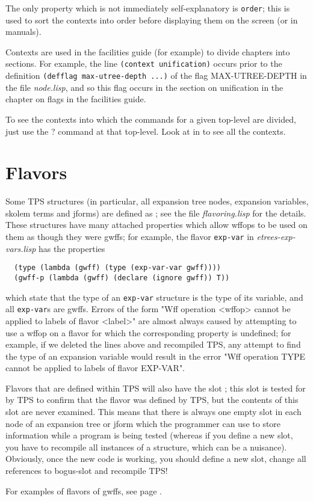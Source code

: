 The only property which is not immediately self-explanatory is {\tt order}; this is used to sort
the contexts into order before displaying them on the screen (or in manuals).

Contexts are used in the facilities guide (for example) to divide
chapters into sections. For example, the line
{\tt (context unification)}
occurs prior to the definition 
{\tt (defflag max-utree-depth ...)}
of the flag MAX-UTREE-DEPTH in the file {\it node.lisp},
and so this flag occurs in the section on unification in the
chapter on flags in the facilities guide.

To see the contexts into which the commands for a given top-level
are divided, just use the ? command at that top-level.
Look at  in \TPS to see all the contexts.

\section{Flavors}
\label{flavors}

Some TPS structures (in particular, all expansion tree nodes, expansion variables, skolem terms and jforms) 
are defined as ; see the file {\it flavoring.lisp} for 
the details. These structures have many attached properties which allow 
wffops to be used on them as though they were gwffs; for example, the flavor
{\tt exp-var} in {\it etrees-exp-vars.lisp} has the properties
\begin{verbatim}
  (type (lambda (gwff) (type (exp-var-var gwff))))
  (gwff-p (lambda (gwff) (declare (ignore gwff)) T))
\end{verbatim}
which state that the type of an {\tt exp-var} structure is the type of its variable, and all {\tt exp-var}s 
are gwffs. Errors of the form "Wff operation <wffop> cannot be applied to labels of flavor <label>" are almost always
caused by attempting to use a wffop on a flavor for which the corresponding property is undefined; for example,
if we deleted the lines above and recompiled TPS, any attempt to find the type of an expansion variable
would result in the error "Wff operation TYPE cannot be applied to labels of flavor EXP-VAR".

Flavors that are defined within TPS will also have the slot {\tt {}}; this slot is 
tested for by TPS to confirm that the flavor was defined by TPS, but the contents of this slot are never 
examined. This means that there is always one empty slot in each node of an expansion tree or jform which the
programmer can use to store information while a program is being tested (whereas if you define a new slot, you have to 
recompile all instances of a structure, which can be a nuisance). Obviously, once the new code is working,
you should define a new slot, change all references to bogus-slot and recompile TPS!

For examples of flavors of gwffs, see page \pageref{labels}.
